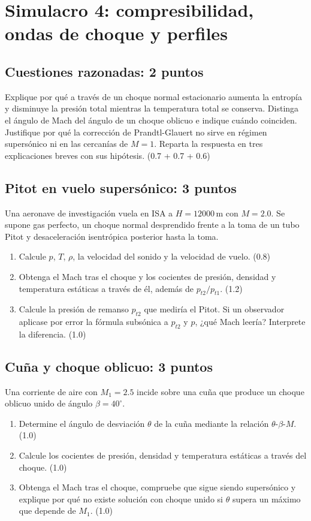 \chapter{Simulacro 4: compresibilidad, ondas de choque y perfiles}
\section{Cuestiones razonadas: 2 puntos}
Explique por qué a través de un choque normal estacionario aumenta la entropía y disminuye la presión total mientras la temperatura total se conserva. Distinga el ángulo de Mach del ángulo de un choque oblicuo e indique cuándo coinciden. Justifique por qué la corrección de Prandtl-Glauert no sirve en régimen supersónico ni en las cercanías de $M=1$. Reparta la respuesta en tres explicaciones breves con sus hipótesis. (0.7 + 0.7 + 0.6)
\section{Pitot en vuelo supersónico: 3 puntos}
Una aeronave de investigación vuela en ISA a $H=12000\,\mathrm m$ con $M=2.0$. Se supone gas perfecto, un choque normal desprendido frente a la toma de un tubo Pitot y desaceleración isentrópica posterior hasta la toma.
\begin{enumerate}[label=\alph*)]
\item Calcule $p$, $T$, $\rho$, la velocidad del sonido y la velocidad de vuelo. (0.8)
\item Obtenga el Mach tras el choque y los cocientes de presión, densidad y temperatura estáticas a través de él, además de $p_{t2}/p_{t1}$. (1.2)
\item Calcule la presión de remanso $p_{t2}$ que mediría el Pitot. Si un observador aplicase por error la fórmula subsónica a $p_{t2}$ y $p$, ¿qué Mach leería? Interprete la diferencia. (1.0)
\end{enumerate}
\section{Cuña y choque oblicuo: 3 puntos}
Una corriente de aire con $M_1=2.5$ incide sobre una cuña que produce un choque oblicuo unido de ángulo $\beta=40^\circ$.
\begin{enumerate}[label=\alph*)]
\item Determine el ángulo de desviación $\theta$ de la cuña mediante la relación $\theta$-$\beta$-$M$. (1.0)
\item Calcule los cocientes de presión, densidad y temperatura estáticas a través del choque. (1.0)
\item Obtenga el Mach tras el choque, compruebe que sigue siendo supersónico y explique por qué no existe solución con choque unido si $\theta$ supera un máximo que depende de $M_1$. (1.0)
\end{enumerate}
